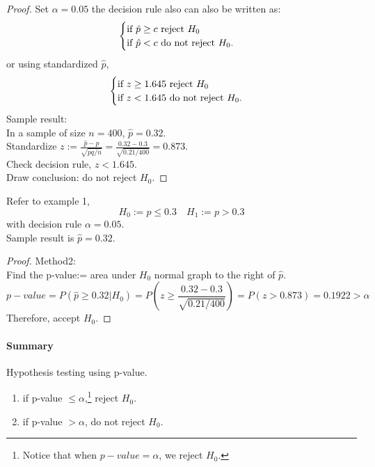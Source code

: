 \documentclass{article}
\begin{document}
		\begin{remark}
			\color{red}{Always put the equal sign with the null hypothesis}
		\end{remark}
		\begin{proof}
			Set $\alpha = 0.05$ the decision rule also can also be written as:
			\[
			\begin{cases}
				\text{{if $\hat{p} \geq c$ reject $H_0$}}\\
				\text{{if $\hat{p} < c$ do not reject $H_0$}}.
			\end{cases}
			\]
			or using standardized $\hat{p}$,
			\[
			\begin{cases}
				\text{{if $z \geq 1.645$ reject $H_0$}}\\
				\text{{if $z < 1.645$ do not reject $H_0$}}.
			\end{cases}
			\]
		Sample result:
		\\
		In a sample of size $n=400$, $\hat{p} = 0.32$.
		\\
		 Standardize $z := \frac{\hat{p} - p}{\sqrt{pq/n}} = \frac{0.32-0.3}{\sqrt{0.21/400}} = 0.873$.
		\\
		 Check decision rule, $z < 1.645$.
		\\
		 Draw conclusion: do not reject $H_0$.
		\end{proof}
		
		
		\begin{example}
			Refer to example 1,
			\[
				H_0:= p \leq 0.3 \quad
				H_1:= p > 0.3
			\]
			with decision rule $\alpha=0.05$.
			\\
			Sample result is $\hat{p}=0.32$.
		\end{example}
		\begin{proof}
			Method2:
			\\
			Find the p-value:= area under $H_0$ normal graph to the right of $\hat{p}$.
			\[
				p-value = P(\hat{p}\geq0.32 | H_0) = P(z \geq \frac{0.32 - 0.3}{\sqrt{0.21/400}}) = P(z > 0.873) = 0.1922 > \alpha
			\]
			Therefore, accept $H_0$.
		\end{proof}
	
		\paragraph{Summary} Hypothesis testing using p-value.
		\begin{enumerate}
			\item if p-value $\leq \alpha$,\footnote{Notice that when $p-value = \alpha$, we reject $H_0$.} reject $H_0$.
			\item if p-value $ > \alpha$, do not reject $H_0$.
		\end{enumerate}
		
\end{document}

